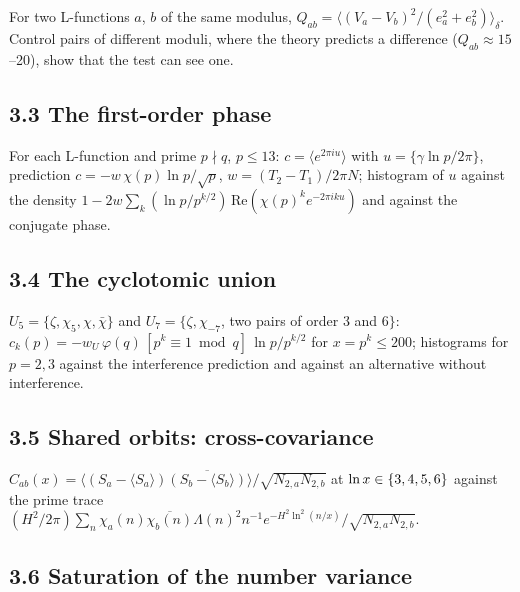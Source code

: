 \documentclass[
  10pt,
]{article}
\begin{document}
For two L-functions \(a\), \(b\) of the same modulus,
\(Q_{ab} = \langle (V_a - V_b)^2/(e_a^2 + e_b^2)\rangle_\delta\).
Control pairs of different moduli, where the theory predicts a
difference (\(Q_{ab} \approx 15\)--20), show that the test can see one.

\hypertarget{the-first-order-phase}{%
\subsection{3.3 The first-order phase}\label{the-first-order-phase}}

For each L-function and prime \(p \nmid q\), \(p \le 13\):
\(c = \langle e^{2\pi i u}\rangle\) with \(u = \{\gamma\ln p/2\pi\}\),
prediction \(c = -w\,\chi(p)\ln p/\sqrt p\), \(w = (T_2 - T_1)/2\pi N\);
histogram of \(u\) against the density
\(1 - 2w\sum_k (\ln p/p^{k/2})\,\mathrm{Re}(\chi(p)^k e^{-2\pi i k u})\)
and against the conjugate phase.

\hypertarget{the-cyclotomic-union}{%
\subsection{3.4 The cyclotomic union}\label{the-cyclotomic-union}}

\(U_5 = \{\zeta, \chi_5, \chi, \bar\chi\}\) and
\(U_7 = \{\zeta, \chi_{-7}\), two pairs of order 3 and 6\(\}\):
\(c_k(p) = -w_U\,\varphi(q)\,[p^k \equiv 1 \bmod q]\,\ln p/p^{k/2}\) for
\(x = p^k \le 200\); histograms for \(p = 2, 3\) against the
interference prediction and against an alternative without interference.

\hypertarget{shared-orbits-cross-covariance}{%
\subsection{3.5 Shared orbits:
cross-covariance}\label{shared-orbits-cross-covariance}}

\(C_{ab}(x) = \langle (S_a - \langle S_a\rangle)\overline{(S_b - \langle S_b\rangle)}\rangle/\sqrt{N_{2,a}N_{2,b}}\)
at \(\ln x \in \{3,\penalty300 4,\penalty300 5,\penalty300 6\}\) against the prime trace
\((H^2/2\pi)\sum_n \chi_a(n)\overline{\chi_b(n)}\Lambda(n)^2 n^{-1}e^{-H^2\ln^2(n/x)}/\sqrt{N_{2,a}N_{2,b}}\).

\hypertarget{saturation-of-the-number-variance}{%
\subsection{3.6 Saturation of the number
variance}\label{saturation-of-the-number-variance}}
\end{document}
